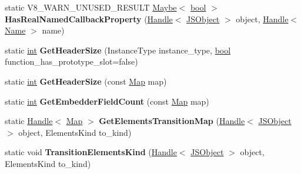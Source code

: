 \begin{DoxyCompactItemize}
\item 
\mbox{\label{classv8_1_1internal_1_1JSObject_af23b4c4843278854fc1701332f8468f1}} 
static V8\+\_\+\+W\+A\+R\+N\+\_\+\+U\+N\+U\+S\+E\+D\+\_\+\+R\+E\+S\+U\+LT \mbox{\hyperlink{classv8_1_1Maybe}{Maybe}}$<$ \mbox{\hyperlink{classbool}{bool}} $>$ {\bfseries Has\+Real\+Named\+Callback\+Property} (\mbox{\hyperlink{classv8_1_1internal_1_1Handle}{Handle}}$<$ \mbox{\hyperlink{classv8_1_1internal_1_1JSObject}{J\+S\+Object}} $>$ object, \mbox{\hyperlink{classv8_1_1internal_1_1Handle}{Handle}}$<$ \mbox{\hyperlink{classv8_1_1internal_1_1Name}{Name}} $>$ name)
\item 
\mbox{\label{classv8_1_1internal_1_1JSObject_aff51f0ad29d67623ffa6eeef98d11f91}} 
static \mbox{\hyperlink{classint}{int}} {\bfseries Get\+Header\+Size} (Instance\+Type instance\+\_\+type, \mbox{\hyperlink{classbool}{bool}} function\+\_\+has\+\_\+prototype\+\_\+slot=false)
\item 
\mbox{\label{classv8_1_1internal_1_1JSObject_a3577f8e4bf5f0a123522c6cc05fb3d8f}} 
static \mbox{\hyperlink{classint}{int}} {\bfseries Get\+Header\+Size} (const \mbox{\hyperlink{classv8_1_1internal_1_1Map}{Map}} map)
\item 
\mbox{\label{classv8_1_1internal_1_1JSObject_aa08b1baac4131a01dd66bf285f0cb0e9}} 
static \mbox{\hyperlink{classint}{int}} {\bfseries Get\+Embedder\+Field\+Count} (const \mbox{\hyperlink{classv8_1_1internal_1_1Map}{Map}} map)
\item 
\mbox{\label{classv8_1_1internal_1_1JSObject_a97f098221e983f00c111222572171de4}} 
static \mbox{\hyperlink{classv8_1_1internal_1_1Handle}{Handle}}$<$ \mbox{\hyperlink{classv8_1_1internal_1_1Map}{Map}} $>$ {\bfseries Get\+Elements\+Transition\+Map} (\mbox{\hyperlink{classv8_1_1internal_1_1Handle}{Handle}}$<$ \mbox{\hyperlink{classv8_1_1internal_1_1JSObject}{J\+S\+Object}} $>$ object, Elements\+Kind to\+\_\+kind)
\item 
\mbox{\label{classv8_1_1internal_1_1JSObject_a62f3dbe23fd6c8eff78781d2a95cb8cb}} 
static void {\bfseries Transition\+Elements\+Kind} (\mbox{\hyperlink{classv8_1_1internal_1_1Handle}{Handle}}$<$ \mbox{\hyperlink{classv8_1_1internal_1_1JSObject}{J\+S\+Object}} $>$ object, Elements\+Kind to\+\_\+kind)

\end{DoxyCompactItemize}
